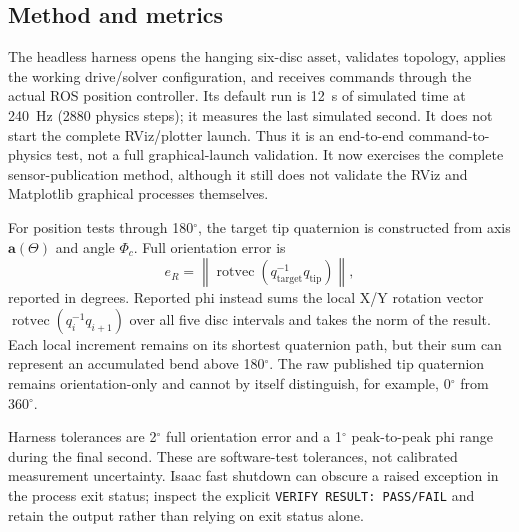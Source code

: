 \documentclass[11pt,letterpaper]{article}
\newcommand{\degrees}{\ensuremath{^{\circ}}}
\begin{document}
\subsection{Method and metrics}
The headless harness opens the hanging six-disc asset, validates topology,
applies the working drive/solver configuration, and receives commands through
the actual ROS position controller. Its default run is 12~s of simulated
time at 240~Hz (2880 physics steps); it measures the last simulated second.
It does not start the complete RViz/plotter launch. Thus it is an end-to-end
command-to-physics test, not a full graphical-launch validation.
It now exercises the complete sensor-publication method, although it still
does not validate the RViz and Matplotlib graphical processes themselves.

For position tests through 180\degrees{}, the target tip quaternion is
constructed from axis $\mathbf{a}(\Theta)$ and angle $\Phi_c$. Full orientation
error is
\begin{equation}
e_R=\left\|\operatorname{rotvec}(q_{\mathrm{target}}^{-1}
q_{\mathrm{tip}})\right\|,
\end{equation}
reported in degrees. Reported phi instead sums the local X/Y rotation vector
$\operatorname{rotvec}(q_i^{-1}q_{i+1})$ over all five disc intervals and
takes the norm of the result. Each local increment remains on its shortest
quaternion path, but their sum can represent an accumulated bend above
180\degrees{}. The raw published tip quaternion remains orientation-only and
cannot by itself distinguish, for example, 0\degrees{} from 360\degrees{}.

Harness tolerances are 2\degrees{} full orientation error and a 1\degrees{}
peak-to-peak phi range during the final second. These are software-test
tolerances, not calibrated measurement uncertainty. Isaac fast shutdown can
obscure a raised exception in the process exit status; inspect the explicit
\texttt{VERIFY RESULT: PASS/FAIL} and retain the output rather than relying
on exit status alone.
\end{document}
